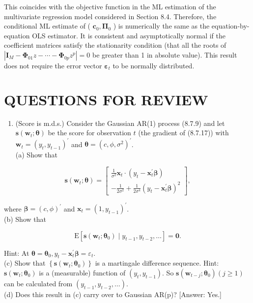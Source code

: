 \documentclass[10pt]{article}
\begin{document}
This coincides with the objective function in the ML estimation of the multivariate regression model considered in Section 8.4. Therefore, the conditional ML estimate of ( $\mathbf{c}_{0}, \boldsymbol{\Pi}_{0}$ ) is numerically the same as the equation-by-equation OLS estimator. It is consistent and asymptotically normal if the coefficient matrices satisfy the stationarity condition (that all the roots of $\left|\mathbf{I}_{M}-\boldsymbol{\Phi}_{01} z-\cdots-\boldsymbol{\Phi}_{0 p} z^{p}\right|=0$ be greater than 1 in absolute value). This result does not require the error vector $\boldsymbol{\varepsilon}_{t}$ to be normally distributed.

\section*{QUESTIONS FOR REVIEW}
\begin{enumerate}
  \item (Score is m.d.s.) Consider the Gaussian AR(1) process (8.7.9) and let $\mathbf{s}\left(\mathbf{w}_{t} ; \boldsymbol{\theta}\right)$ be the score for observation $t$ (the gradient of (8.7.17)) with $\mathbf{w}_{t}=\left(y_{t}, y_{t-1}\right)^{\prime}$ and $\boldsymbol{\theta}=\left(c, \phi, \sigma^{2}\right)^{\prime}$.\\
(a) Show that
\end{enumerate}

$$
\mathbf{s}\left(\mathbf{w}_{t} ; \boldsymbol{\theta}\right)=\left[\begin{array}{c}
\frac{1}{\sigma^{2}} \mathbf{x}_{t} \cdot\left(y_{t}-\mathbf{x}_{t}^{\prime} \boldsymbol{\beta}\right) \\
-\frac{1}{2 \sigma^{2}}+\frac{1}{2 \sigma^{4}}\left(y_{t}-\mathbf{x}_{t}^{\prime} \boldsymbol{\beta}\right)^{2}
\end{array}\right],
$$

where $\boldsymbol{\beta}=(c, \phi)^{\prime}$ and $\mathbf{x}_{t}=\left(1, y_{t-1}\right)^{\prime}$.\\
(b) Show that

$$
\mathrm{E}\left[\mathbf{s}\left(\mathbf{w}_{t} ; \boldsymbol{\theta}_{0}\right) \mid y_{t-1}, y_{t-2}, \ldots\right]=\mathbf{0} .
$$

Hint: At $\boldsymbol{\theta}=\boldsymbol{\theta}_{0}, y_{t}-\mathbf{x}_{t}^{\prime} \boldsymbol{\beta}=\varepsilon_{t}$.\\
(c) Show that $\left\{\mathbf{s}\left(\mathbf{w}_{t} ; \boldsymbol{\theta}_{0}\right)\right\}$ is a martingale difference sequence. Hint: $\mathbf{s}\left(\mathbf{w}_{t} ; \boldsymbol{\theta}_{0}\right)$ is a (measurable) function of $\left(y_{t}, y_{t-1}\right)$. So $\mathbf{s}\left(\mathbf{w}_{t-j} ; \boldsymbol{\theta}_{0}\right)(j \geq 1)$ can be calculated from $\left(y_{t-1}, y_{t-2}, \ldots\right)$.\\[0pt]
(d) Does this result in (c) carry over to Gaussian AR(p)? [Answer: Yes.]
\end{document}
